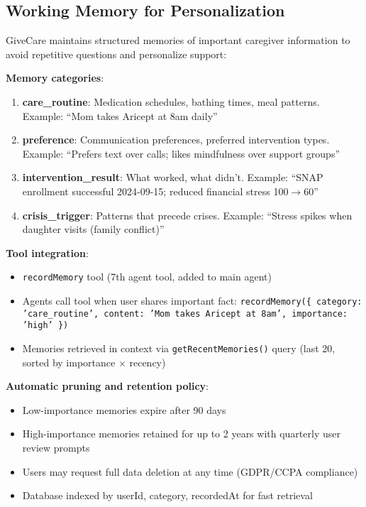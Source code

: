 \documentclass{article}
\begin{document}
\subsection{Working Memory for Personalization}%
\label{subsec:WorkingMemoryforPersonalization}%
GiveCare maintains structured memories of important caregiver information to avoid repetitive questions and personalize support:

\textbf{Memory categories}:
\begin{enumerate}
    \item \textbf{care\_routine}: Medication schedules, bathing times, meal patterns. Example: ``Mom takes Aricept at 8am daily''
    \item \textbf{preference}: Communication preferences, preferred intervention types. Example: ``Prefers text over calls; likes mindfulness over support groups''
    \item \textbf{intervention\_result}: What worked, what didn't. Example: ``SNAP enrollment successful 2024-09-15; reduced financial stress 100$\rightarrow$60''
    \item \textbf{crisis\_trigger}: Patterns that precede crises. Example: ``Stress spikes when daughter visits (family conflict)''
\end{enumerate}

\textbf{Tool integration}:
\begin{itemize}
    \item \texttt{recordMemory} tool (7th agent tool, added to main agent)
    \item Agents call tool when user shares important fact: \texttt{recordMemory(\{ category: 'care\_routine', content: 'Mom takes Aricept at 8am', importance: 'high' \})}
    \item Memories retrieved in context via \texttt{getRecentMemories()} query (last 20, sorted by importance $\times$ recency)
\end{itemize}

\textbf{Automatic pruning and retention policy}:
\begin{itemize}
    \item Low-importance memories expire after 90 days
    \item High-importance memories retained for up to 2 years with quarterly user review prompts
    \item Users may request full data deletion at any time (GDPR/CCPA compliance)
    \item Database indexed by userId, category, recordedAt for fast retrieval
\end{itemize}
\end{document}
